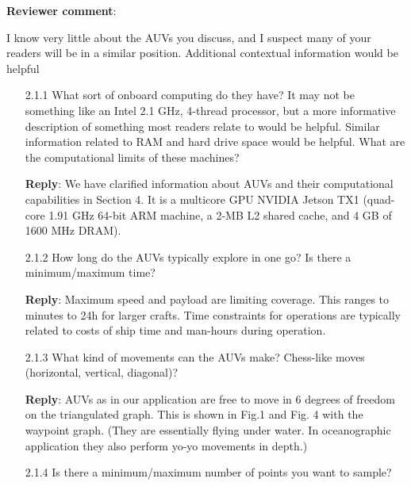 \documentclass[a4paper]{article}
\newcounter{reviewer}
\def\revcom{\textbf{Reviewer comment}}
\def\reply{\textbf{Reply}}
\begin{document}
\setcounter{reviewer}{2}

\begin{answers}
\item{\revcom : }\label{r2c1}

I know very little about the AUVs you discuss, and I suspect many of your readers will be in a similar position. Additional contextual information would be helpful

\begin{itemize}[noitemsep,topsep=0pt,parsep=0pt,partopsep=0pt]

\item[2.1.1] What sort of onboard computing do they have? It may not be something like an Intel 2.1 GHz, 4-thread processor, but a more informative description of something most readers relate to would be helpful. Similar information related to RAM and hard drive space would be helpful. What are the computational limits of these machines?\par

\reply: We have clarified information about AUVs and their computational capabilities in Section 4. 
It is a multicore GPU NVIDIA Jetson TX1 (quad-core 1.91 GHz 64-bit ARM machine, a 2-MB L2 shared cache, and 4 GB of 1600 MHz DRAM). 
\vspace{1em}

\item[2.1.2] How long do the AUVs typically explore in one go? Is there a minimum/maximum time?\par 

\reply: Maximum speed and payload are limiting coverage. This ranges to minutes to 24h for larger crafts. Time constraints for operations are typically related to costs of ship time and man-hours during operation.  
\vspace{1em}

\item[2.1.3] What kind of movements can the AUVs make? Chess-like moves (horizontal, vertical, diagonal)?\par  

\reply: AUVs as in our application are free to move in 6 degrees of freedom on the triangulated graph. This is shown in Fig.1 and Fig. 4 with the waypoint graph. (They are essentially flying under water. In oceanographic application they also perform yo-yo movements in depth.) 
\vspace{1em}

\item[2.1.4] Is there a minimum/maximum number of points you want to sample?\par


\end{itemize}
\end{answers}
\end{document}
